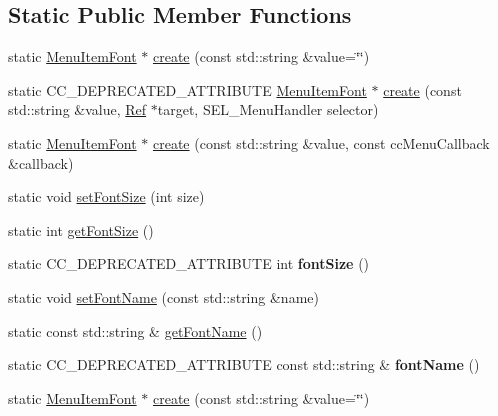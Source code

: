\subsection*{Static Public Member Functions}
\begin{DoxyCompactItemize}
\item 
static \hyperlink{classMenuItemFont}{Menu\+Item\+Font} $\ast$ \hyperlink{classMenuItemFont_a0c2ac0d236b3a4118f60a88e0ed5c2bb}{create} (const std\+::string \&value=\char`\"{}\char`\"{})
\item 
static C\+C\+\_\+\+D\+E\+P\+R\+E\+C\+A\+T\+E\+D\+\_\+\+A\+T\+T\+R\+I\+B\+U\+TE \hyperlink{classMenuItemFont}{Menu\+Item\+Font} $\ast$ \hyperlink{classMenuItemFont_af84e40c702a3ae82aa5e46674c6bd5eb}{create} (const std\+::string \&value, \hyperlink{classRef}{Ref} $\ast$target, S\+E\+L\+\_\+\+Menu\+Handler selector)
\item 
static \hyperlink{classMenuItemFont}{Menu\+Item\+Font} $\ast$ \hyperlink{classMenuItemFont_a1eef04399142b10da39c8c3ee08fdb56}{create} (const std\+::string \&value, const cc\+Menu\+Callback \&callback)
\item 
static void \hyperlink{classMenuItemFont_a7731c16b60705da0b62216cb65e4c9f4}{set\+Font\+Size} (int size)
\item 
static int \hyperlink{classMenuItemFont_a5a19c21d111b5a0b79708777d10346cf}{get\+Font\+Size} ()
\item 
\mbox{\label{classMenuItemFont_a23c12f9c180c901873b06b648112cf28}} 
static C\+C\+\_\+\+D\+E\+P\+R\+E\+C\+A\+T\+E\+D\+\_\+\+A\+T\+T\+R\+I\+B\+U\+TE int {\bfseries font\+Size} ()
\item 
static void \hyperlink{classMenuItemFont_a7c23ecf46a3a1b7d22d97065c801e637}{set\+Font\+Name} (const std\+::string \&name)
\item 
static const std\+::string \& \hyperlink{classMenuItemFont_ab5cfddd334c7eadec61292fd1e59a94a}{get\+Font\+Name} ()
\item 
\mbox{\label{classMenuItemFont_a24c0f6ef0db101c0595b9b67f66fc903}} 
static C\+C\+\_\+\+D\+E\+P\+R\+E\+C\+A\+T\+E\+D\+\_\+\+A\+T\+T\+R\+I\+B\+U\+TE const std\+::string \& {\bfseries font\+Name} ()
\item 
static \hyperlink{classMenuItemFont}{Menu\+Item\+Font} $\ast$ \hyperlink{classMenuItemFont_ade8727184f3999b6bd1009add7d84719}{create} (const std\+::string \&value=\char`\"{}\char`\"{})
\item 

\end{DoxyCompactItemize}
